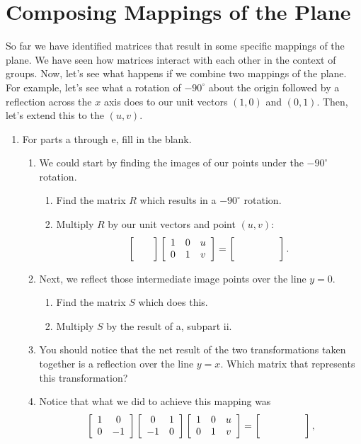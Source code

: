 \documentclass[../gatm.tex]{subfiles}
\begin{document}
\section{Composing Mappings of the Plane}

So far we have identified matrices that result in some specific mappings of the plane. We have seen how matrices interact with each other in the context of groups. Now, let's see what happens if we combine two mappings of the plane. For example, let's see what a rotation of $-90^\circ$ about the origin followed by a reflection across the $x$ axis does to our unit vectors $(1,0)$ and $(0,1)$. Then, let's extend this to the $(u,v)$.

\begin{enumerate}
\item For parts a through e, fill in the blank.
\begin{enumerate}
\item We could start by finding the images of our points under the $-90^\circ$ rotation. 
\begin{enumerate}
\item Find the matrix $R$ which results in a $-90^\circ$ rotation.
\item Multiply $R$ by our unit vectors and point $(u,v)$: $$\twomat{}{}{}{}\left[\begin{array}{ccc} 1 & 0 & u \\ 0 & 1 & v \end{array}\right] = \left[\phantom{\begin{array}{ccc} 1 & 0 & u \\ 0 & 1 & v \end{array}}\right].$$
\end{enumerate}
\item Next, we reflect those intermediate image points over the line $y=0$.
\begin{enumerate}
\item Find the matrix $S$ which does this.
\item Multiply $S$ by the result of a, subpart ii.
\end{enumerate}
\item You should notice that the net result of the two transformations taken together is a reflection over the line $y=x$. Which matrix that represents this transformation? 
\item Notice that what we did to achieve this mapping was $$\twomat{1}{0}{0}{-1}\twomat{0}{1}{-1}{0}\left[\begin{array}{ccc} 1 & 0 & u \\ 0 & 1 & v \end{array}\right]=\left[\phantom{\begin{array}{ccc} 1 & 0 & u \\ 0 & 1 & v \end{array}}\right],$$

\end{enumerate}
\end{enumerate}
\end{document}
